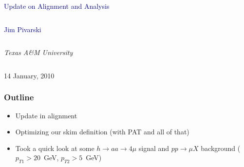 \documentclass[compress]{beamer}
\begin{document}
\begin{frame}
\vfill
\begin{center}
\textcolor{darkblue}{\Large Update on Alignment and Analysis}

\vfill
\begin{columns}
\begin{center}
\large
\textcolor{darkblue}{Jim Pivarski}
\end{center}
\end{columns}

\begin{columns}
\begin{center}
\scriptsize
{\it Texas A\&M University}
\end{center}
\end{columns}

\vfill
14 January, 2010

\end{center}
\end{frame}


\small

\begin{frame}
\frametitle{Outline}
\begin{itemize}\setlength{\itemsep}{0.75 cm}
\item Update in alignment
\item Optimizing our skim definition (with PAT and all of that)
\item Took a quick look at some $h \to aa \to 4\mu$ signal and $pp \to
  \mu X$ background ($p_{T1} > 20$~GeV, $p_{T2} > 5$~GeV)
\end{itemize}
\end{frame}
\end{document}
